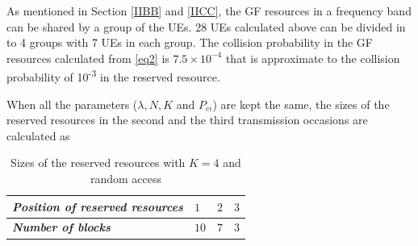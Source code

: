 \documentclass[conference]{IEEEtran}
\begin{document}

As mentioned in Section \ref{IIBB} and \ref{IICC}, the GF resources in a frequency band can be shared by a group of the UEs. 28 UEs calculated above can be divided in to 4 groups with 7 UEs in each group. The collision probability in the GF resources calculated from \eqref{eq2} is $7.5\times10^{-4}$ that is approximate to the collision probability of 10\textsuperscript{-3} in the reserved resource.

When all the parameters ($\lambda, N, K$ and $P_{ci}$) are kept the same, the sizes of the reserved resources in the second and the third transmission occasions are calculated as
\begin{table}[htbp]
\caption{Sizes of the reserved resources with $K=4$ and random access}
\begin{center}
\begin{tabular}{|p{10em}|p{2em}|p{2em}|p{2em}|}
 \hline
 \textbf{\textit{Position of reserved resources}} & $1$ &$2$ &$3$ \\ 
 \hline
 \textbf{\textit{Number of blocks}} & $10$ &$7$ &$3$ \\

 
 \hline
\end{tabular}
\label{tab1}
\end{center}
\end{table}
\end{document}

